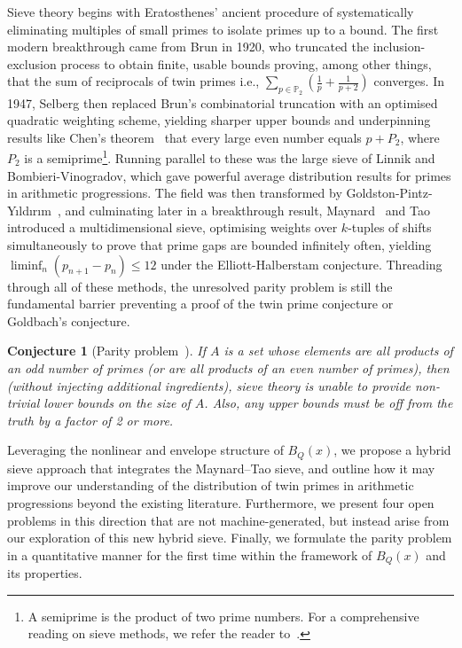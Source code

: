 \documentclass[11pt,reqno]{amsart}
\theoremstyle{plain}\newtheorem{theorem}{Theorem}[section]
\newtheorem{conjecture}{Conjecture}[section]
\numberwithin{equation}{section}
\begin{document}
\medskip
\noindent
Sieve theory begins with Eratosthenes' ancient procedure of systematically eliminating multiples of small primes to isolate primes up to a bound. The first modern breakthrough came from Brun in 1920, who truncated the inclusion-exclusion process to obtain finite, usable bounds proving, among other things, that the sum of reciprocals of twin primes i.e., $\sum_{p\in\mathbb{P}_2}\left(\frac{1}{p}+\frac{1}{p+2}\right)$ converges. In 1947, Selberg then replaced Brun's combinatorial truncation with an optimised quadratic weighting scheme, yielding sharper upper bounds and underpinning results like Chen's theorem~\cite{chen} that every large even number equals $p+P_2$, where $P_2$ is a semiprime\footnote{A semiprime is the product of two prime numbers. For a comprehensive reading on sieve methods, we refer the reader to~\cite{harman}.}. Running parallel to these was the large sieve of Linnik and Bombieri-Vinogradov, which gave powerful average distribution results for primes in arithmetic progressions. The field was then transformed by Goldston-Pintz-Y{\i}ld{\i}r{\i}m~\cite{GPY1,GPY2,GPY3,GPY4}, and culminating later in a breakthrough result, Maynard~\cite{James2} and Tao introduced a multidimensional sieve, optimising weights over $k$-tuples of shifts simultaneously to prove that prime gaps are bounded infinitely often, yielding $\liminf_n(p_{n+1}-p_n) \leq 12$ under the Elliott-Halberstam conjecture. Threading through all of these methods, the unresolved parity problem is still the fundamental barrier preventing a proof of the twin prime conjecture or Goldbach's conjecture.

\begin{conjecture}[Parity problem~\cite{tao}]
If $A$ is a set whose elements are all products of an odd number of primes (or are all products of an even number of primes), then (without injecting additional ingredients), sieve theory is unable to provide non-trivial lower bounds on the size of $A$. Also, any upper bounds must be off from the truth by a factor of 2 or more.  
\end{conjecture}

\noindent
Leveraging the nonlinear and envelope structure of $B_Q(x)$, we propose a hybrid sieve approach that integrates the Maynard–Tao sieve, and outline how it may improve our understanding of the distribution of twin primes in arithmetic progressions beyond the existing literature. Furthermore, we present four open problems in this direction that are not machine-generated, but instead arise from our exploration of this new hybrid sieve. Finally, we formulate the parity problem in a quantitative manner for the first time within the framework of $B_Q(x)$ and its properties.
\end{document}
